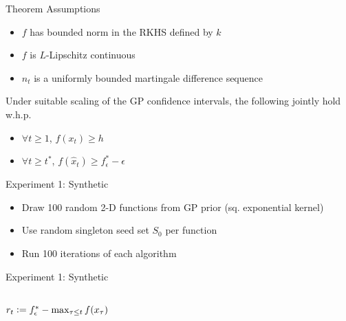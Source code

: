 \documentclass[xetex,10pt,mathserif,handout]{beamer}
\newlength\figureheight
\newlength\figurewidth
\newcommand{\defeq}{\vcentcolon=}
\begin{document}
\begin{frame}{Theorem}
Assumptions
\vspace{1em}
\begin{itemize}
  \item $f$ has bounded norm in the RKHS defined by $k$
  \vspace{1em}
  \item $f$ is $L$-Lipschitz continuous
  \vspace{1em}
  \item $n_t$ is a uniformly bounded martingale difference sequence
\end{itemize}
\vspace{2em}
Under suitable scaling of the GP confidence intervals, the following jointly hold w.h.p.
\vspace{1em}
\begin{itemize}
  \item $\forall t \geq 1$, $f(x_t) \geq h$
  \vspace{1em}
  \item $\forall t \geq t^*$, $f(\hat{x}_t) \geq f^*_{\epsilon} - \epsilon$
\end{itemize}
\end{frame}

\begin{frame}{Experiment 1: Synthetic}
\centering
\setlength\figurewidth{4.5in}
\setlength\figureheight{5in}

\vspace{1em}
\begin{itemize}
\item Draw 100 random 2-D functions from GP prior (sq. exponential kernel)
\vspace{1em}
\item Use random singleton seed set $S_0$ per function
\vspace{1em}
\item Run 100 iterations of each algorithm
\end{itemize}
\end{frame}

\begin{frame}{Experiment 1: Synthetic}
\begin{columns}[c]
\centering
$r_t \defeq f^*_{\epsilon} - \max_{\tau \leq t}f(x_{\tau})$\\
\setlength\figurewidth{2.8in}
\setlength\figureheight{4.3in}
\setlength\figurewidth{2.5in}
\setlength\figureheight{3.7in}
\end{columns}
\end{frame}
\end{document}
